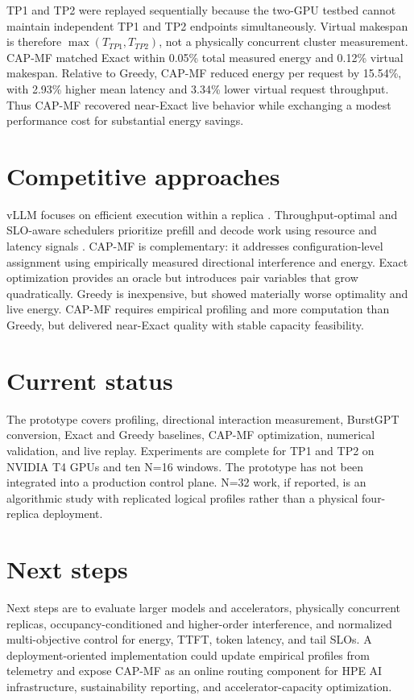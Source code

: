 \documentclass[11pt]{article}
\begin{document}
TP1 and TP2 were replayed sequentially because the two-GPU testbed cannot maintain independent TP1 and TP2 endpoints simultaneously. Virtual makespan is therefore $\max(T_{TP1},T_{TP2})$, not a physically concurrent cluster measurement. CAP-MF matched Exact within 0.05\% total measured energy and 0.12\% virtual makespan. Relative to Greedy, CAP-MF reduced energy per request by 15.54\%, with 2.93\% higher mean latency and 3.34\% lower virtual request throughput. Thus CAP-MF recovered near-Exact live behavior while exchanging a modest performance cost for substantial energy savings.

\section*{Competitive approaches}
vLLM focuses on efficient execution within a replica \cite{ref:vllm}. Throughput-optimal and SLO-aware schedulers prioritize prefill and decode work using resource and latency signals \cite{ref:optimal-scheduling}. CAP-MF is complementary: it addresses configuration-level assignment using empirically measured directional interference and energy. Exact optimization provides an oracle but introduces pair variables that grow quadratically. Greedy is inexpensive, but showed materially worse optimality and live energy. CAP-MF requires empirical profiling and more computation than Greedy, but delivered near-Exact quality with stable capacity feasibility.

\section*{Current status}
The prototype covers profiling, directional interaction measurement, BurstGPT conversion, Exact and Greedy baselines, CAP-MF optimization, numerical validation, and live replay. Experiments are complete for TP1 and TP2 on NVIDIA T4 GPUs and ten N=16 windows. The prototype has not been integrated into a production control plane. N=32 work, if reported, is an algorithmic study with replicated logical profiles rather than a physical four-replica deployment.

\section*{Next steps}
Next steps are to evaluate larger models and accelerators, physically concurrent replicas, occupancy-conditioned and higher-order interference, and normalized multi-objective control for energy, TTFT, token latency, and tail SLOs. A deployment-oriented implementation could update empirical profiles from telemetry and expose CAP-MF as an online routing component for HPE AI infrastructure, sustainability reporting, and accelerator-capacity optimization.
\end{document}
